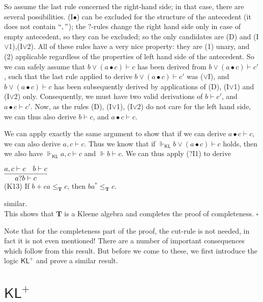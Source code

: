 \documentclass{eptcs}
\newcommand{\proofend}{\hfill $\square$}
\newcommand{\KL}{\mathsf{KL}}
\begin{document}
So assume the last rule concerned the right-hand side;
in that case, there are several possibilities.
(I$\bullet$) can be excluded for the structure of the antecedent 
(it does not
contain $``,"$); 
the $?$-rules  change the right hand side only in case of
empty antecedent, so they can be excluded; so the only
candidates are  (D) and (I$\vee$1),(I$\vee$2). All of these rules have
a very nice property: they are (1) unary, and (2) applicable
regardless of the properties of left hand side of the
antecedent. So we can safely assume that
$b\vee (a\bullet c)\vdash c$ has been derived from 
$b\vee (a\bullet c)\vdash c'$, such that the last rule applied to
derive
$b\vee (a\bullet c)\vdash c'$ was ($\vee$I), and 
$b\vee (a\bullet c)\vdash c$ has been subsequently derived 
by applications of (D), (I$\vee$1) and (I$\vee$2) only. Consequently,
we must have two valid derivations of 
$b\vdash c'$, and $a\bullet c\vdash c'$. Now, as the rules
(D), (I$\vee$1), (I$\vee$2) do not care for the left hand side, we can
thus also derive $b\vdash c$, and $a\bullet c\vdash c$.

We can apply exactly the same argument to show that if we can derive
$a\bullet c\vdash c$, we can also derive $a,c\vdash c$. 
Thus we know
that if $\Vdash_\KL b\vee (a\bullet c)\vdash c$ holds, then we 
also have $\Vdash_\KL a,c\vdash c$ and $\Vdash b\vdash c$.
We can thus apply (?I1) to derive

$\infer{a?b\vdash c}{a,c\vdash c & b\vdash c}$
\\

(K13) If $b+ca\leq_{\textbf{T}} c$, then $ba^*\leq_{\textbf{T}} c$.

similar.
\\

This shows that $\textbf{T}$ is a Kleene algebra and completes the proof
of completeness.
\proofend

Note that for the completeness part of the proof, the cut-rule is
not needed, in fact it is not even mentioned! There are a number 
of important consequences which follow from this
result. But before we come to these, we first introduce the logic $\KL^+$
and prove a similar result.

\section{$\KL^+$}
\end{document}

